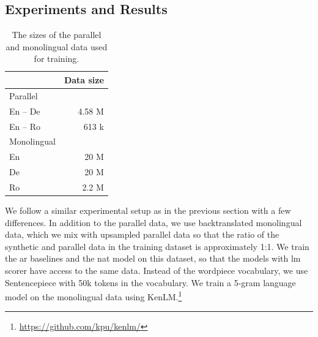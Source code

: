 \subsection{Experiments and Results}


\begin{table}
  \centering
  \begin{tabular}{lr}
    \toprule
    & Data size \\
    \midrule
    Parallel & \\
    En -- De & 4.58 M \\
    En -- Ro & 613 k \\
    \addlinespace
    Monolingual & \\
    En & 20 M \\
    De & 20 M \\
    Ro & 2.2 M \\
    \bottomrule
  \end{tabular}

  \caption{The sizes of the parallel and monolingual data used for training.}%
  \label{tab:ngrams:data}
\end{table}

We follow a similar experimental setup as in the previous section with a few
differences. In addition to the parallel data, we use backtranslated
monolingual data, which we mix with upsampled parallel data so that the ratio
of the synthetic and parallel data in the training dataset is approximately
1:1. We train the \ac{ar} baselines and the \ac{nat} model on this dataset, so
that the models with \ac{lm} scorer have access to the same data.  Instead of
the wordpiece vocabulary, we use Sentencepiece
\citep{kudo-richardson-2018-sentencepiece} with 50k tokens in the vocabulary.
We train a 5-gram language model on the monolingual data using KenLM.\footnote{\url{https://github.com/kpu/kenlm/}}


